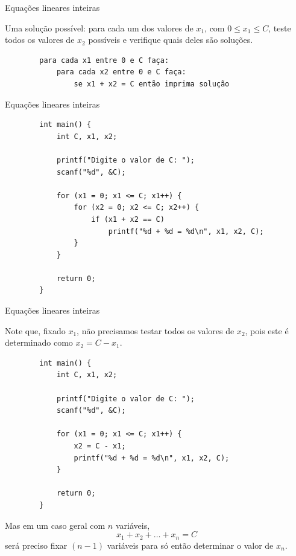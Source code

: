 \documentclass[handout]{beamer}
\begin{document}
\begin{frame}[fragile]{Equações lineares inteiras}

    Uma solução possível: para cada um dos valores de $x_1$, com $0 \le x_1 \le C$, teste todos os valores de $x_2$ possíveis e verifique quais deles são soluções.

    \begin{verbatim}
        para cada x1 entre 0 e C faça:
            para cada x2 entre 0 e C faça:
                se x1 + x2 = C então imprima solução
    \end{verbatim}
\end{frame}

\begin{frame}[fragile]{Equações lineares inteiras}

    \begin{verbatim}
        int main() {
            int C, x1, x2;

            printf("Digite o valor de C: ");
            scanf("%d", &C);

            for (x1 = 0; x1 <= C; x1++) {
                for (x2 = 0; x2 <= C; x2++) {
                    if (x1 + x2 == C)
                        printf("%d + %d = %d\n", x1, x2, C);
                }
            }

            return 0;
        }
    \end{verbatim}
\end{frame}

\begin{frame}[fragile]{Equações lineares inteiras}

    Note que, fixado $x_1$, não precisamos testar todos os valores de $x_2$, pois este é determinado como $x_2 = C - x_1$.

    \begin{verbatim}
        int main() {
            int C, x1, x2;

            printf("Digite o valor de C: ");
            scanf("%d", &C);

            for (x1 = 0; x1 <= C; x1++) {
                x2 = C - x1;
                printf("%d + %d = %d\n", x1, x2, C);
            }

            return 0;
        }
    \end{verbatim}

    Mas em um caso geral com $n$ variáveis, 
    $$x_1 + x_2 + \ldots + x_n = C $$ 
    será preciso fixar $(n-1)$ variáveis para só então determinar o valor de $x_n$.

\end{frame}
\end{document}
